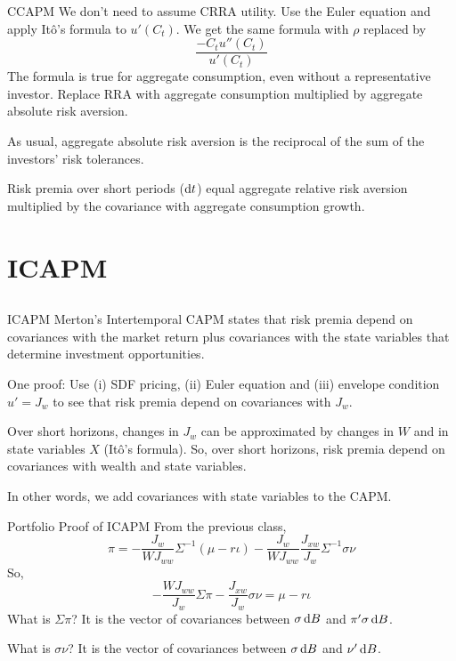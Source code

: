 \documentclass[xcolor=dvipsnames,10pt]{beamer}
\begin{document}
\begin{frame}{CCAPM}
We don't need to assume CRRA utility.  Use the Euler equation and apply It\^o's formula to $u'(C_t)$.  We get the same formula with $\rho$ replaced by
$$\frac{-C_tu''(C_t)}{u'(C_t)}$$
The formula is true for aggregate consumption, even without a representative investor.  Replace RRA with aggregate consumption multiplied by aggregate absolute risk aversion.

As usual, aggregate absolute risk aversion is the reciprocal of the sum of the investors' risk tolerances.

Risk premia over short periods ($\mathrm{d} t$) equal aggregate relative risk aversion multiplied by the covariance with aggregate consumption growth.
\end{frame}

\section{ICAPM}\subsection{}
\begin{frame}{ICAPM}
Merton's Intertemporal CAPM states that risk premia depend on covariances with the market return plus covariances with the state variables that determine investment opportunities.

One proof: Use (i) SDF pricing, (ii)  Euler equation and (iii) envelope condition $u' = J_w$ to see that risk premia depend on covariances with $J_w$.

Over short horizons, changes in $J_w$ can be approximated by changes in $W$ and in state variables $X$ (It\^o's formula).  So, over short horizons, risk premia depend on covariances with wealth and state variables.

In other words, we add covariances with state variables to the CAPM.
\end{frame}

\begin{frame}{Portfolio Proof of ICAPM}
From the previous class,
$$\pi = -\frac{J_w}{WJ_{ww}}\Sigma^{-1}(\mu-r\iota)-\frac{J_w}{WJ_{ww}}\frac{J_{xw}}{J_w}\Sigma^{-1} \sigma\nu$$
So,
$$-\frac{WJ_{ww}}{J_w}\Sigma\pi - \frac{J_{xw}}{J_w}\sigma\nu = \mu-r\iota $$
What is $\Sigma\pi$? \pause It is the vector of covariances between $\sigma\,\mathrm{d} B$ and $\pi'\sigma\,\mathrm{d} B$.

\pause What is $\sigma\nu$? \pause It is the vector of covariances between $\sigma\,\mathrm{d} B$ and $\nu'\,\mathrm{d} B$.
\end{frame}
\end{document}
